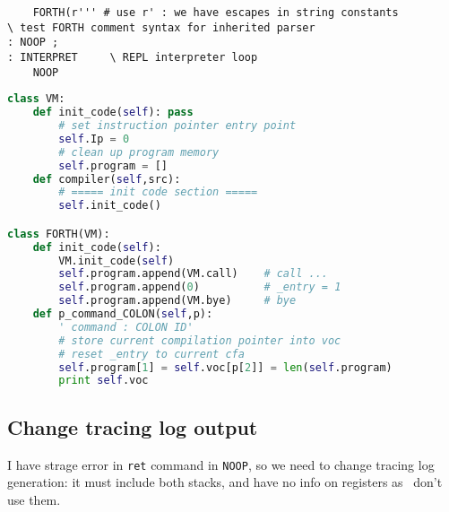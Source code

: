 \begin{lstlisting}
	FORTH(r''' # use r' : we have escapes in string constants
\ test FORTH comment syntax for inherited parser
: NOOP ;
: INTERPRET		\ REPL interpreter loop
	NOOP
\end{lstlisting}
\begin{lstlisting}[language=Python]
class VM:
	def init_code(self): pass
		# set instruction pointer entry point
		self.Ip = 0							
		# clean up program memory	
		self.program = []
	def compiler(self,src):
		# ===== init code section =====
		self.init_code()

class FORTH(VM):
	def init_code(self):
		VM.init_code(self)
		self.program.append(VM.call)	# call ...
		self.program.append(0)			# _entry = 1
		self.program.append(VM.bye)		# bye
  	def p_command_COLON(self,p):
  		' command : COLON ID'
  		# store current compilation pointer into voc
		# reset _entry to current cfa
  		self.program[1] = self.voc[p[2]] = len(self.program)
		print self.voc
\end{lstlisting}

\subsection{Change tracing log output}

I have strage error in \verb|ret| command in \verb|NOOP|, so we need to change
tracing log generation: it must include both stacks, and have no info on
registers as \F\ don't use them.

